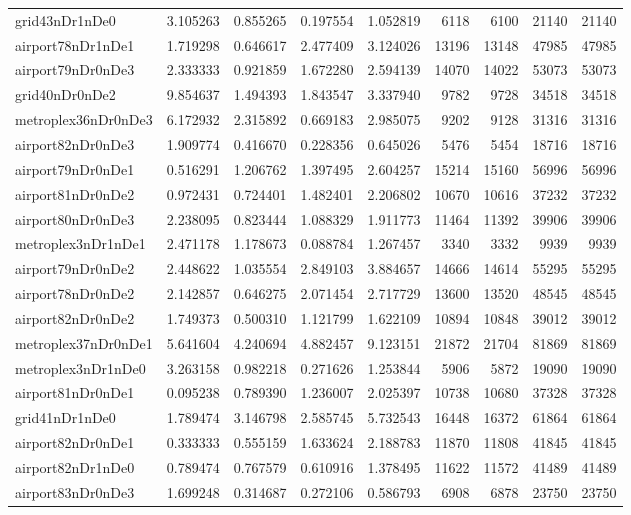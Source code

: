\begin{longtable}{|l|r|r|r|r|r|r|r|r|}
grid43nDr1nDe0 & 3.105263 & 0.855265 & 0.197554 & 1.052819 & 6118 & 6100 & 21140 & 21140 \\
airport78nDr1nDe1 & 1.719298 & 0.646617 & 2.477409 & 3.124026 & 13196 & 13148 & 47985 & 47985 \\
airport79nDr0nDe3 & 2.333333 & 0.921859 & 1.672280 & 2.594139 & 14070 & 14022 & 53073 & 53073 \\
grid40nDr0nDe2 & 9.854637 & 1.494393 & 1.843547 & 3.337940 & 9782 & 9728 & 34518 & 34518 \\
metroplex36nDr0nDe3 & 6.172932 & 2.315892 & 0.669183 & 2.985075 & 9202 & 9128 & 31316 & 31316 \\
airport82nDr0nDe3 & 1.909774 & 0.416670 & 0.228356 & 0.645026 & 5476 & 5454 & 18716 & 18716 \\
airport79nDr0nDe1 & 0.516291 & 1.206762 & 1.397495 & 2.604257 & 15214 & 15160 & 56996 & 56996 \\
airport81nDr0nDe2 & 0.972431 & 0.724401 & 1.482401 & 2.206802 & 10670 & 10616 & 37232 & 37232 \\
airport80nDr0nDe3 & 2.238095 & 0.823444 & 1.088329 & 1.911773 & 11464 & 11392 & 39906 & 39906 \\
metroplex3nDr1nDe1 & 2.471178 & 1.178673 & 0.088784 & 1.267457 & 3340 & 3332 & 9939 & 9939 \\
airport79nDr0nDe2 & 2.448622 & 1.035554 & 2.849103 & 3.884657 & 14666 & 14614 & 55295 & 55295 \\
airport78nDr0nDe2 & 2.142857 & 0.646275 & 2.071454 & 2.717729 & 13600 & 13520 & 48545 & 48545 \\
airport82nDr0nDe2 & 1.749373 & 0.500310 & 1.121799 & 1.622109 & 10894 & 10848 & 39012 & 39012 \\
metroplex37nDr0nDe1 & 5.641604 & 4.240694 & 4.882457 & 9.123151 & 21872 & 21704 & 81869 & 81869 \\
metroplex3nDr1nDe0 & 3.263158 & 0.982218 & 0.271626 & 1.253844 & 5906 & 5872 & 19090 & 19090 \\
airport81nDr0nDe1 & 0.095238 & 0.789390 & 1.236007 & 2.025397 & 10738 & 10680 & 37328 & 37328 \\
grid41nDr1nDe0 & 1.789474 & 3.146798 & 2.585745 & 5.732543 & 16448 & 16372 & 61864 & 61864 \\
airport82nDr0nDe1 & 0.333333 & 0.555159 & 1.633624 & 2.188783 & 11870 & 11808 & 41845 & 41845 \\
airport82nDr1nDe0 & 0.789474 & 0.767579 & 0.610916 & 1.378495 & 11622 & 11572 & 41489 & 41489 \\
airport83nDr0nDe3 & 1.699248 & 0.314687 & 0.272106 & 0.586793 & 6908 & 6878 & 23750 & 23750 \\

\end{longtable}
